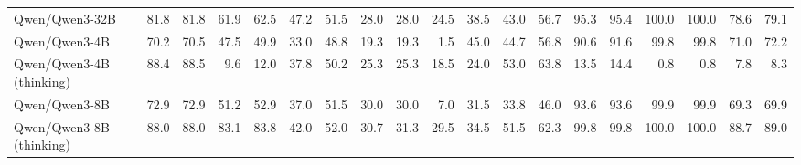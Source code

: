 \documentclass{article}
\begin{document}
\begin{table}[htbp]
\begin{threeparttable}
\begin{adjustbox}{max width=\textwidth}
\begin{tabular}{lrrrrrrrrrrrrrrrrrr}
Qwen/Qwen3-32B & \cellcolor[HTML]{C1DEEC}81.8 & \cellcolor[HTML]{C1DEEC}81.8 & \cellcolor[HTML]{E5F1F7}61.9 & \cellcolor[HTML]{E6F1F7}62.5 & \cellcolor[HTML]{FDF4F0}47.2 & \cellcolor[HTML]{FDF3EF}51.5 & \cellcolor[HTML]{FDF5F1}28.0 & \cellcolor[HTML]{FDF3EF}28.0 & \cellcolor[HTML]{FEFCFB}24.5 & \cellcolor[HTML]{EEF6FA}38.5 & \cellcolor[HTML]{E9F3F8}43.0 & \cellcolor[HTML]{DBECF4}56.7 & \cellcolor[HTML]{9DCBE1}95.3 & \cellcolor[HTML]{9DCBE1}95.4 & \cellcolor[HTML]{92C5DE}100.0 & \cellcolor[HTML]{92C5DE}100.0 & \cellcolor[HTML]{BCDBEA}78.6 & \cellcolor[HTML]{BDDBEB}79.1 \\
Qwen/Qwen3-4B & \cellcolor[HTML]{FDFEFE}70.2 & \cellcolor[HTML]{FBFDFE}70.5 & \cellcolor[HTML]{FDF5F1}47.5 & \cellcolor[HTML]{FEF7F4}49.9 & \cellcolor[HTML]{F8C8B3}33.0 & \cellcolor[HTML]{FCEAE2}48.8 & \cellcolor[HTML]{F9D4C3}19.3 & \cellcolor[HTML]{F9D2C1}19.3 & \cellcolor[HTML]{F4A582}1.5 & \cellcolor[HTML]{C5E0ED}45.0 & \cellcolor[HTML]{E1EFF5}44.7 & \cellcolor[HTML]{DAEBF4}56.8 & \cellcolor[HTML]{A9D1E5}90.6 & \cellcolor[HTML]{A7D0E4}91.6 & \cellcolor[HTML]{92C5DE}99.8 & \cellcolor[HTML]{92C5DE}99.8 & \cellcolor[HTML]{CFE5F0}71.0 & \cellcolor[HTML]{CEE4F0}72.2 \\
Qwen/Qwen3-4B (thinking) & \cellcolor[HTML]{9FCCE2}88.4 & \cellcolor[HTML]{9FCBE1}88.5 & \cellcolor[HTML]{F4A582}9.6 & \cellcolor[HTML]{F4A582}12.0 & \cellcolor[HTML]{FAD7C7}37.8 & \cellcolor[HTML]{FDEFE9}50.2 & \cellcolor[HTML]{FCEBE3}25.3 & \cellcolor[HTML]{FCE9E1}25.3 & \cellcolor[HTML]{FBE5DB}18.5 & \cellcolor[HTML]{F7BFA6}24.0 & \cellcolor[HTML]{B5D7E8}53.0 & \cellcolor[HTML]{B6D8E9}63.8 & \cellcolor[HTML]{F4A582}13.5 & \cellcolor[HTML]{F4A582}14.4 & \cellcolor[HTML]{F4A582}0.8 & \cellcolor[HTML]{F4A582}0.8 & \cellcolor[HTML]{F4A582}7.8 & \cellcolor[HTML]{F4A582}8.3 \\
Qwen/Qwen3-8B & \cellcolor[HTML]{EFF6FA}72.9 & \cellcolor[HTML]{EFF6FA}72.9 & \cellcolor[HTML]{FEFDFC}51.2 & \cellcolor[HTML]{FEFEFE}52.9 & \cellcolor[HTML]{F9D5C4}37.0 & \cellcolor[HTML]{FDF3EF}51.5 & \cellcolor[HTML]{FEFCFB}30.0 & \cellcolor[HTML]{FEFBF9}30.0 & \cellcolor[HTML]{F6B99E}7.0 & \cellcolor[HTML]{FCE7DD}31.5 & \cellcolor[HTML]{FCE9E0}33.8 & \cellcolor[HTML]{FDEFE8}46.0 & \cellcolor[HTML]{A2CDE2}93.6 & \cellcolor[HTML]{A2CDE2}93.6 & \cellcolor[HTML]{92C5DE}99.9 & \cellcolor[HTML]{92C5DE}99.9 & \cellcolor[HTML]{D3E7F1}69.3 & \cellcolor[HTML]{D3E7F1}69.9 \\
Qwen/Qwen3-8B (thinking) & \cellcolor[HTML]{A1CDE2}88.0 & \cellcolor[HTML]{A1CDE2}88.0 & \cellcolor[HTML]{AED4E6}83.1 & \cellcolor[HTML]{AED3E6}83.8 & \cellcolor[HTML]{FBE4D9}42.0 & \cellcolor[HTML]{FDF5F1}52.0 & \cellcolor[HTML]{FFFFFF}30.7 & \cellcolor[HTML]{FDFEFE}31.3 & \cellcolor[HTML]{EBF4F9}29.5 & \cellcolor[HTML]{FEF7F3}34.5 & \cellcolor[HTML]{BDDCEB}51.5 & \cellcolor[HTML]{BEDCEB}62.3 & \cellcolor[HTML]{92C5DE}99.8 & \cellcolor[HTML]{92C5DE}99.8 & \cellcolor[HTML]{92C5DE}100.0 & \cellcolor[HTML]{92C5DE}100.0 & \cellcolor[HTML]{A3CEE3}88.7 & \cellcolor[HTML]{A4CEE3}89.0 \\

\end{tabular}
\end{adjustbox}
\end{threeparttable}
\end{table}
\end{document}
